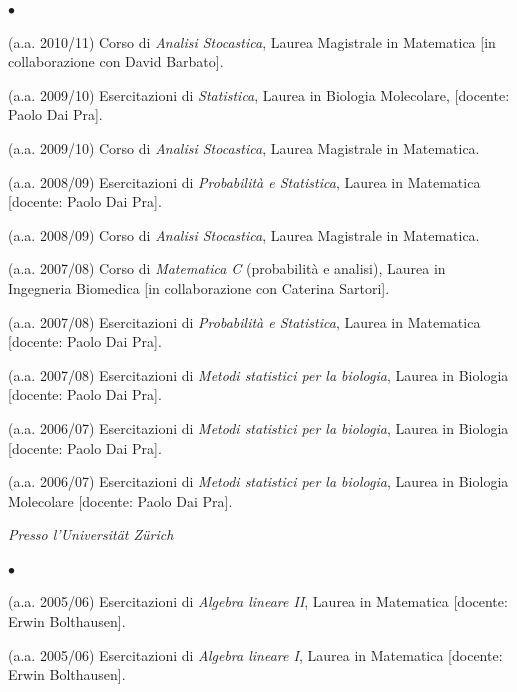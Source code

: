 \documentclass[a4paper,11pt,oneside]{amsart}
\newenvironment{myitemize}{%
\begin{list}{$\bullet$}%
 	{%
	\setlength{\itemsep}{0.3em}%
	\setlength{\topsep}{0.3em}%
	\setlength{\partopsep}{0em}%
	\setlength{\parsep}{0em}%
	\setlength{\parskip}{0em}%
	\setlength\leftmargin{1.5em}%
	\setlength\labelwidth{1.1em}%
	\setlength{\labelsep}{0.4em}%
	}%
	}%
{\end{list}}
\renewenvironment{itemize}{
\begin{myitemize}}%
{\end{myitemize}}
\begin{document}
\begin{itemize}
\item (a.a. 2010/11)
Corso di \textit{Analisi Stocastica},
Laurea Magistrale in Matematica
[in collaborazione con David Barbato].

\item (a.a. 2009/10) Esercitazioni di \textit{Statistica}, Laurea in Biologia Molecolare,
[docente: Paolo Dai Pra].

\item (a.a. 2009/10)
Corso di \textit{Analisi Stocastica},
Laurea Magistrale in Matematica.

\item (a.a. 2008/09)
Esercitazioni di \textit{Probabilità e Statistica},
Laurea in Matematica
[docente: Paolo Dai Pra].

\item (a.a. 2008/09)
Corso di \textit{Analisi Stocastica},
Laurea Magistrale in Matematica.

\item (a.a. 2007/08)
Corso di \textit{Matematica C} (probabilità e analisi),
Laurea in Ingegneria Biomedica
[in collaborazione con Caterina Sartori].

\item (a.a. 2007/08)
Esercitazioni di \textit{Probabilità e Statistica},
Laurea in Matematica
[docente: Paolo Dai Pra].

\item (a.a. 2007/08)
Esercitazioni di \textit{Metodi statistici per la biologia},
Laurea in Biologia
[docente: Paolo Dai Pra].

\item (a.a. 2006/07)
Esercitazioni di \textit{Metodi statistici per la biologia},
Laurea in Biologia [docente: Paolo Dai Pra].

\item (a.a. 2006/07)
Esercitazioni di \textit{Metodi statistici per la biologia},
Laurea in Biologia Molecolare [docente: Paolo Dai Pra].
\end{itemize}


\smallskip
\emph{Presso l'Universit\"at Z\"urich}

\begin{itemize}
\item (a.a. 2005/06) Esercitazioni di \textit{Algebra lineare II},
Laurea in Matematica [docente: Erwin Bol\-thau\-sen].

\item (a.a. 2005/06) Esercitazioni di \textit{Algebra lineare I},
Laurea in Matematica [docente: Erwin Bol\-thau\-sen].
\end{itemize}
\end{document}
